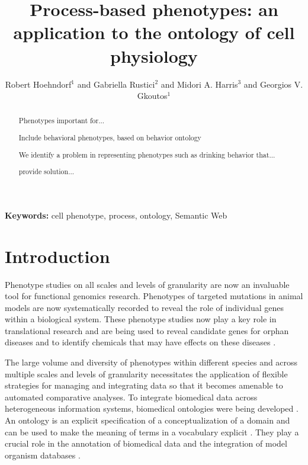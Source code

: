 \documentclass{bioinfo}
\renewcommand{\cite}{\citep}
\begin{document}

\title{Process-based phenotypes: an application to the ontology of
  cell physiology}

\author[Hoehndorf et al.]{Robert Hoehndorf$^1$ and Gabriella
  Rustici$^2$ and Midori A. Harris$^3$ and Georgios V. Gkoutos$^{1}$}

\address{$^{1}$Department of Genetics, University of Cambridge,
  Downing Street, Cambridge, Cambridge CB2 3EH, UK\\
  $^{2}$EBI, Wellcome Trust Genome Campus, Hinxton, Cambridge,
  Cambridge CB10 1SD, UK\\
  $^{3}$Department of Biochemistry; University of Cambridge, 80 Tennis
  Court Road, Cambridge CB2 1GA, UK}

\maketitle
 
\begin{abstract}
  Phenotypes important for...

  Include behavioral phenotypes, based on behavior ontology

  We identify a problem in representing phenotypes such as drinking
  behavior that...

  provide solution...
\end{abstract}

{\bf Keywords:} cell phenotype, process, ontology, Semantic Web

\section{Introduction}
Phenotype studies on all scales and levels of granularity are now an
invaluable tool for functional genomics research. Phenotypes of
targeted mutations in animal models are now systematically recorded to
reveal the role of individual genes within a biological system. These
phenotype studies now play a key role in translational research and
are being used to reveal candidate genes for orphan diseases and to
identify chemicals that may have effects on these diseases \cite{}.

The large volume and diversity of phenotypes within different species
and across multiple scales and levels of granularity necessitates the
application of flexible strategies for managing and integrating data
so that it becomes amenable to automated comparative analyses. To
integrate biomedical data across heterogeneous information systems,
biomedical ontologies were being developed \cite{Smith2007}. An
ontology is an explicit specification of a conceptualization of a
domain and can be used to make the meaning of terms in a vocabulary
explicit \cite{Gruber1995, Guarino1998}. They play a crucial role in
the annotation of biomedical data and the integration of model
organism databases \cite{go2010, Bada2004, goble}.
\end{document}
